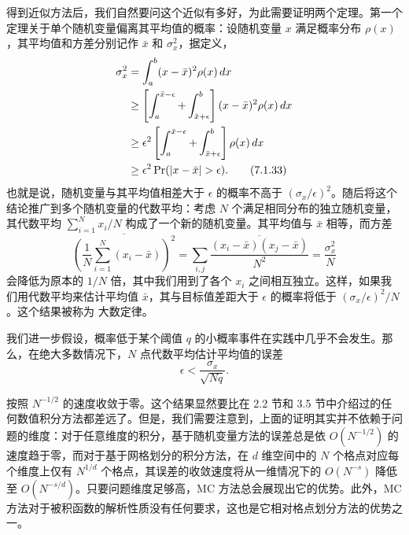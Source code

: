 得到近似方法后，我们自然要问这个近似有多好，为此需要证明两个定理。第一个定理关于单个随机变量偏离其平均值的概率：设随机变量 $x$ 满足概率分布 $\rho(x)$，其平均值和方差分别记作 $\bar x$ 和 $\sigma_x^2$，据定义，
\begin{align}
 \sigma_x^2
 &=\int_a^b(x-\bar x)^2\rho(x)\,dx\notag\\
 &\ge\left[\int_a^{\bar x-\epsilon}+\int_{\bar x+\epsilon}^{b}\right](x-\bar x)^2\rho(x)\,dx\notag\\
 &\ge\epsilon^2\left[\int_a^{\bar x-\epsilon}+\int_{\bar x+\epsilon}^{b}\right]\rho(x)\,dx\notag\\
 &\ge\epsilon^2\Pr(|x-\bar x|>\epsilon).
\tag{7.1.33}
\end{align}
也就是说，随机变量与其平均值相差大于 $\epsilon$ 的概率不高于 $(\sigma_x/\epsilon)^2$。随后将这个结论推广到多个随机变量的代数平均：考虑 $N$ 个满足相同分布的独立随机变量，其代数平均 $\sum_{i=1}^{N}x_i/N$ 构成了一个新的随机变量。其平均值与 $\bar x$ 相等，而方差
\begin{equation}
 \overline{\left(\frac1N\sum_{i=1}^{N}(x_i-\bar x)\right)^2}
 =\sum_{i,j}\frac{\overline{(x_i-\bar x)(x_j-\bar x)}}{N^2}
 =\frac{\sigma_x^2}{N}
\tag{7.1.34}
\end{equation}
会降低为原本的 $1/N$ 倍，其中我们用到了各个 $x_i$ 之间相互独立。这样，如果我们用代数平均来估计平均值 $\bar x$，其与目标值差距大于 $\epsilon$ 的概率将低于 $(\sigma_x/\epsilon)^2/N$。这个结果被称为 \ChebName 大数定律。

我们进一步假设，概率低于某个阈值 $q$ 的小概率事件在实践中几乎不会发生。那么，在绝大多数情况下，$N$ 点代数平均估计平均值的误差
\begin{equation}
 \epsilon<\frac{\sigma_x}{\sqrt{Nq}}.
\tag{7.1.35}
\end{equation}

按照 $N^{-1/2}$ 的速度收敛于零。这个结果显然要比在 2.2 节和 3.5 节中介绍过的任何数值积分方法都差远了。但是，我们需要注意到，上面的证明其实并不依赖于问题的维度：对于任意维度的积分，基于随机变量方法的误差总是依 $O(N^{-1/2})$ 的速度趋于零，而对于基于网格划分的积分方法，在 $d$ 维空间中的 $N$ 个格点对应每个维度上仅有 $N^{1/d}$ 个格点，其误差的收敛速度将从一维情况下的 $O(N^{-s})$ 降低至 $O(N^{-s/d})$。只要问题维度足够高，MC 方法总会展现出它的优势。此外，MC 方法对于被积函数的解析性质没有任何要求，这也是它相对格点划分方法的优势之一。

